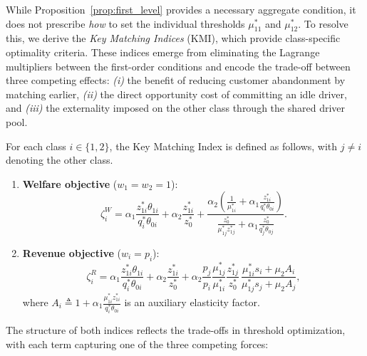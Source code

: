 While Proposition~\ref{prop:first_level} provides a necessary aggregate condition, it does not prescribe \emph{how} to set the individual thresholds $\mu_{11}^*$ and $\mu_{12}^*$.
To resolve this, we derive the \emph{Key Matching Indices} (KMI), which provide class-specific optimality criteria.
These indices emerge from eliminating the Lagrange multipliers between the first-order conditions and encode the trade-off between three competing effects: \emph{(i)} the benefit of reducing customer abandonment by matching earlier, \emph{(ii)} the direct opportunity cost of committing an idle driver, and \emph{(iii)} the externality imposed on the other class through the shared driver pool.

\begin{definition}
\label{def:kmi}
For each class $i \in \{1,2\}$, the Key Matching Index is defined as follows, with $j \neq i$ denoting the other class.
\begin{enumerate}
\item \textbf{Welfare objective} ($w_1=w_2=1$):
\begin{equation}
\zeta_i^{W}
=
\alpha_1 \frac{z_{1i}^*\theta_{1i}}{q_i^*\theta_{0i}}
+
\alpha_2\frac{z_{1i}^*}{z_0^*}
+
\frac{
\alpha_2\!\left(\frac{1}{\mu_{1i}^*} 
+ 
\alpha_1\frac{z_{1i}^*}{q_i^*\theta_{0i}}\right)
}{
\frac{z_0^*}{\mu_{1j}^*z_{1j}^*}
+
\alpha_1\frac{z_0^*}{q_j^*\theta_{0j}}
}.
\label{eq:kmi_welfare}
\end{equation}

\item \textbf{Revenue objective} ($w_i=p_i$):
\begin{equation}
\zeta_i^{R}
=
\alpha_1\frac{z_{1i}^*\theta_{1i}}{q_i^*\theta_{0i}}
+
\alpha_2\frac{z_{1i}^*}{z_0^*}
+
\alpha_2\frac{p_j}{p_i}
\frac{\mu_{1j}^*}{\mu_{1i}^*}
\frac{z_{1j}^*}{z_0^*}\,
\frac{\mu_{1i}^*s_i + \mu_2A_i}{\mu_{1j}^*s_j + \mu_2A_j},
\label{eq:kmi_revenue}
\end{equation}
where $A_i \triangleq 1 + \alpha_1 \frac{\mu_{1i}^* z_{1i}^*}{q_i^* \theta_{0i}}$ is an auxiliary elasticity factor.
\end{enumerate}
\end{definition}

The structure of both indices reflects the trade-offs in threshold optimization, with each term capturing one of the three competing forces:

